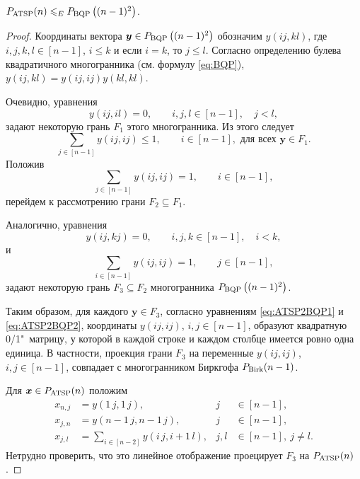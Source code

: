 \begin{lemma}
$P_{\textup{ATSP}}(n) \leqslant_E P_{\textup{BQP}}\left((n-1)^2\right)$. 
\end{lemma}
\begin{proof}
Координаты вектора $\bm{y} \in P_{\textup{BQP}}\left((n-1)^2\right)$ обозначим $y(ij,kl)$, где $i,j,k,l \in [n-1]$, $i \le k$ и если $i = k$, то $j \le l$.
Согласно определению булева квадратичного многогранника (см. формулу \eqref{eq:BQP}), $y(ij,kl) = y(ij,ij) y(kl,kl)$.

Очевидно, уравнения 
\[
y(ij,il) = 0, \qquad i,j,l \in [n-1], \quad j < l,
\]
задают некоторую грань $F_1$ этого многогранника.
Из этого следует
\[
\sum_{j\in[n-1]} y(ij,ij) \le 1, \qquad i \in [n-1], \text{ для всех }\bm{y}\in F_1.
\]
Положив 
\begin{equation}
\label{eq:ATSP2BQP1}
\sum_{j\in[n-1]} y(ij,ij) = 1, \qquad i \in [n-1],
\end{equation}
перейдем к рассмотрению грани $F_2 \subseteq F_1$.

Аналогично, уравнения
\[
y(ij,kj) = 0, \qquad i,j,k \in [n-1], \quad i < k,
\]
и
\begin{equation}
\label{eq:ATSP2BQP2}
\sum_{i\in[n-1]} y(ij,ij) = 1, \qquad j \in [n-1],
\end{equation}
задают некоторую грань $F_3 \subseteq F_2$ многогранника $P_{\textup{BQP}}\left((n-1)^2\right)$.

Таким образом, для каждого $\bm{y} \in F_3$,
согласно уравнениям \eqref{eq:ATSP2BQP1} и \eqref{eq:ATSP2BQP2},  
координаты $y(ij,ij)$, $i,j\in[n-1]$, образуют квадратную 0/1"~матрицу,
у которой в каждой строке и каждом столбце имеется ровно одна единица.
В частности, проекция грани $F_3$ на переменные $y(ij,ij)$, $i,j\in[n-1]$, совпадает с многогранником Биркгофа $P_{\textup{Birk}}(n-1)$.

Для $\bm{x} \in P_{\textup{ATSP}}(n)$ положим
\begin{align*}
x_{n,j} &= y(1\,j, 1\,j),     & j&\in[n-1],\\
x_{j,n} &= y(n-1\,j, n-1\,j), & j&\in[n-1],\\
x_{j,l} &= \sum_{i\in[n-2]} y(i\,j, i+1\,l), & j,l&\in[n-1], \ j\neq l.
\end{align*}
Нетрудно проверить, что это линейное отображение проецирует $F_3$ на $P_{\textup{ATSP}}(n)$.
\end{proof}


